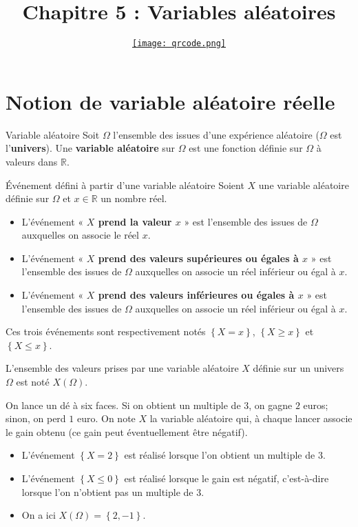 \documentclass[11pt]{article}
\title{\vspace{-10mm}Chapitre 5 : Variables aléatoires}
\date{\vspace{-14mm}
\href{https://erou.forge.aeif.fr/spe-1e/variables-aleatoires.html}{
  \texttt{[image: qrcode.png]}}
\vspace{-12mm}}
\author{}
\begin{document}
\maketitle\thispagestyle{fancy}

\section{Notion de variable aléatoire réelle}

\begin{defi}{Variable aléatoire}
  Soit $\Omega$ l'ensemble des issues d'une expérience aléatoire ($\Omega$ est
  l'\textbf{univers}). Une \textbf{variable aléatoire} sur $\Omega$ est une
  fonction définie sur $\Omega$ à valeurs dans $\mathbb{R}$.
\end{defi}

\begin{defi}{Événement défini à partir d'une variable aléatoire}
  Soient $X$ une variable aléatoire définie sur $\Omega$ et $x\in\mathbb{R}$ un
  nombre réel.
  \begin{itemize}
    \item L'événement « \textbf{$X$ prend la valeur $x$} » est l'ensemble des
      issues de $\Omega$ auxquelles on associe le réel $x$.
    \item L'événement « \textbf{$X$ prend des valeurs supérieures ou égales
      à $x$} » est l'ensemble des
      issues de $\Omega$ auxquelles on associe un réel inférieur ou égal à $x$.
    \item L'événement « \textbf{$X$ prend des valeurs inférieures ou égales
      à $x$} » est l'ensemble des
      issues de $\Omega$ auxquelles on associe un réel inférieur ou égal à $x$.
  \end{itemize}
\end{defi}
\begin{notation}
  Ces trois événements sont respectivement notés $\left\{ X=x \right\}$,
  $\left\{ X\geq x \right\}$ et $\left\{ X\leq x \right\}$.
\end{notation}

\begin{notation}
  L'ensemble des valeurs prises par une variable aléatoire $X$ définie sur un
  univers $\Omega$ est noté $X(\Omega)$.
\end{notation}

\begin{exemple}
  On lance un dé à six faces. Si on obtient un multiple de $3$, on gagne $2$
  euros; sinon, on perd $1$ euro. On note $X$ la variable aléatoire qui, à
  chaque lancer associe le gain obtenu (ce gain peut éventuellement être
  négatif).
  \begin{itemize}
    \item L'événement $\left\{ X=2 \right\}$ est réalisé lorsque l'on obtient un
      multiple de $3$.
    \item L'événement $\left\{ X\leq0 \right\}$ est réalisé lorsque le gain est
      négatif, c'est-à-dire lorsque l'on n'obtient pas un multiple de $3$.
    \item On a ici $X\left( \Omega \right)=\left\{ 2, -1 \right\}$.
  \end{itemize}
\end{exemple}
\end{document}
